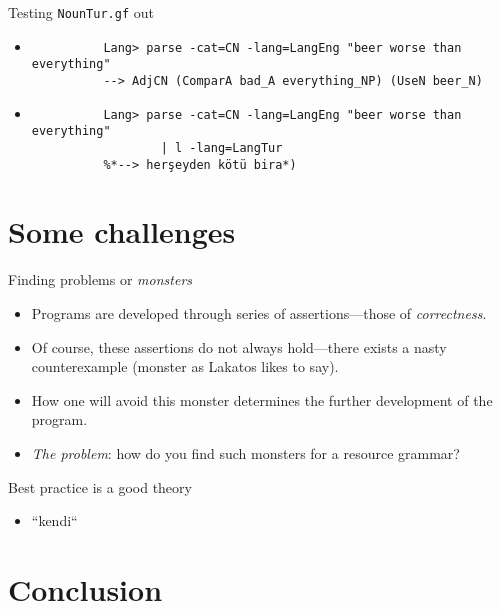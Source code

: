 \documentclass{beamer}
\begin{document}
  \begin{frame}[fragile]{Testing \texttt{NounTur.gf} out}
    \begin{itemize}
      \item<1->
        \begin{lstlisting}
          Lang> parse -cat=CN -lang=LangEng "beer worse than everything"
          --> AdjCN (ComparA bad_A everything_NP) (UseN beer_N)
        \end{lstlisting}
      \item<2->
        \begin{lstlisting}
          Lang> parse -cat=CN -lang=LangEng "beer worse than everything"
                  | l -lang=LangTur
          %*--> herşeyden kötü bira*)
        \end{lstlisting}
    \end{itemize}
  \end{frame}

  \section{Some challenges}

  \begin{frame}{Finding problems or \emph{monsters}}
    \begin{itemize}
      \item<1-> Programs are developed through series of assertions---those
        of \emph{correctness}.
      \item<2-> Of course, these assertions do not always hold---there exists a
        nasty counterexample (monster as Lakatos likes to say).
      \item<3-> How one will avoid this monster determines the further
        development of the program.
      \item<4-> \emph{The problem}: how do you find such monsters for a resource
        grammar?
    \end{itemize}
  \end{frame}

  \begin{frame}{Best practice is a good theory}
    \begin{itemize}
      \item<1-> ``kendi``
    \end{itemize}
  \end{frame}

  \section{Conclusion}
\end{document}
